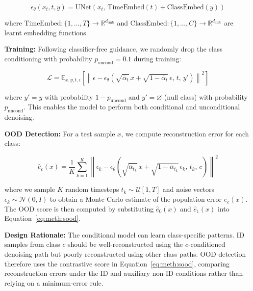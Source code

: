 \begin{equation}
\label{eq:meth:unet_formulation}
\epsilon_\theta(x_t, t, y) = \text{UNet}\!\left(x_t,\, \text{TimeEmbed}(t) + \text{ClassEmbed}(y)\right)
\end{equation}

where $\text{TimeEmbed} : \{1, \ldots, T\} \to \mathbb{R}^{d_{\text{emb}}}$ and $\text{ClassEmbed} : \{1, \ldots, C\} \to \mathbb{R}^{d_{\text{emb}}}$ are learnt embedding functions.

\textbf{Training:} Following classifier-free guidance, we randomly drop the class conditioning with probability $p_{\text{uncond}} = 0.1$ during training:

\begin{equation}
\label{eq:meth:cfg_training}
\mathcal{L} = \mathbb{E}_{x,y,t,\epsilon} \left[ \left\| \epsilon - \epsilon_\theta\!\left( \sqrt{\bar{\alpha}_t}\, x + \sqrt{1 - \bar{\alpha}_t}\,\epsilon,\, t,\, y' \right) \right\|^2 \right]
\end{equation}

where $y' = y$ with probability $1 - p_{\text{uncond}}$ and $y' = \varnothing$ (null class) with probability $p_{\text{uncond}}$. This enables the model to perform both conditional and unconditional denoising.

\textbf{OOD Detection:} For a test sample $x$, we compute reconstruction error for each class:

\begin{equation}
\label{eq:meth:ec_estimate}
\hat{e}_c(x) = \frac{1}{K} \sum_{k=1}^{K} \left\| \epsilon_k - \epsilon_\theta\!\left( \sqrt{\bar{\alpha}_{t_k}}\, x + \sqrt{1 - \bar{\alpha}_{t_k}}\, \epsilon_k,\, t_k,\, c \right) \right\|^2
\end{equation}

where we sample $K$ random timesteps $t_k \sim \mathcal{U}[1, T]$ and noise vectors $\epsilon_k \sim \mathcal{N}(0, I)$ to obtain a Monte Carlo estimate of the population error $e_c(x)$. The OOD score is then computed by substituting $\hat{e}_0(x)$ and $\hat{e}_1(x)$ into Equation~\ref{eq:meth:sood}.

\textbf{Design Rationale:} The conditional model can learn class-specific patterns. ID samples from class $c$ should be well-reconstructed using the $c$-conditioned denoising path but poorly reconstructed using other class paths. OOD detection therefore uses the contrastive score in Equation~\ref{eq:meth:sood}, comparing reconstruction errors under the ID and auxiliary non-ID conditions rather than relying on a minimum-error rule.


